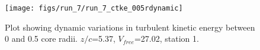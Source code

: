 \begin{figure}[H]
\centering
\texttt{[image: figs/run\_7/run\_7\_ctke\_005rdynamic]}
\caption{Plot showing dynamic variations in turbulent kinetic energy between 0 and 0.5 core radii. $z/c$=5.37, $V_{free}$=27.02, station 1.}
\label{fig:run_7_ctke_005rdynamic}
\end{figure}


